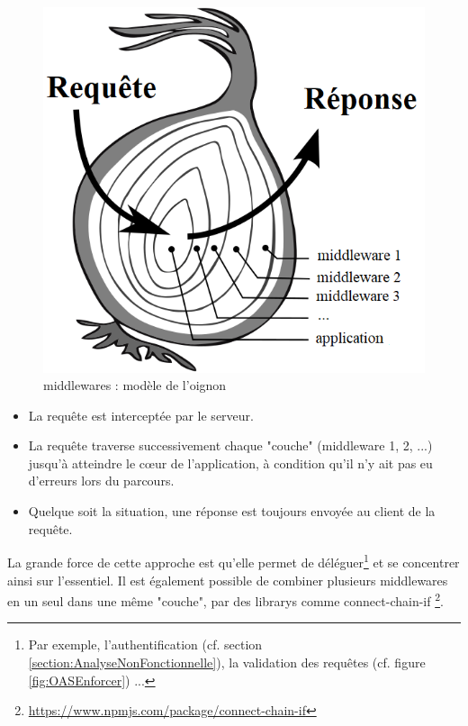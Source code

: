\begin{figure}[H]
    \includegraphics[width=\textwidth,height=0.25\textheight,keepaspectratio]{images/serveur/middleware_onion.png}
    \centering
    \caption{\Glspl{middleware} : modèle de l'oignon}
    \label{fig:middlewareOnion}
\end{figure}

\begin{itemize}[nosep,noitemsep,topsep=0pt,partopsep=0pt,after=\vspace*{2pt}]
    \item La requête est interceptée par le serveur.
    \item La requête traverse successivement chaque "couche" (\gls{middleware} 1, 2, ...) jusqu'à atteindre le cœur de l'application, 
    à condition qu'il n'y ait pas eu d'erreurs lors du parcours.
    \item Quelque soit la situation, une réponse est toujours envoyée au client de la requête.
\end{itemize}

La grande force de cette approche est qu'elle permet de déléguer\footnote{
    Par exemple, l'authentification (cf. section \ref{section:AnalyseNonFonctionnelle}), la validation des requêtes (cf. figure \ref{fig:OASEnforcer}) ...
} et se concentrer ainsi sur l'essentiel. Il est également possible de combiner plusieurs \glspl{middleware} en un seul dans une même "couche", par des \glspl{library} comme connect-chain-if
\footnote{
    \url{https://www.npmjs.com/package/connect-chain-if}
}.


